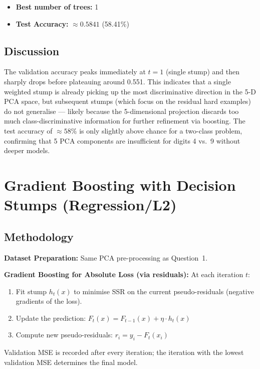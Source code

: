 \documentclass[12pt,a4paper]{article}
\begin{document}
\begin{itemize}[nosep]
  \item \textbf{Best number of trees:} 1
  \item \textbf{Test Accuracy:} $\approx 0.5841$ (58.41\%)
\end{itemize}

\subsection{Discussion}

The validation accuracy peaks immediately at $t=1$ (single stump) and then sharply drops before plateauing around 0.551. This indicates that a single weighted stump is already picking up the most discriminative direction in the 5-D PCA space, but subsequent stumps (which focus on the residual hard examples) do not generalise — likely because the 5-dimensional projection discards too much class-discriminative information for further refinement via boosting. The test accuracy of $\approx58\%$ is only slightly above chance for a two-class problem, confirming that 5 PCA components are insufficient for digits 4 vs.\ 9 without deeper models.

\section{Gradient Boosting with Decision Stumps (Regression/L2)}

\subsection{Methodology}

\textbf{Dataset Preparation:} Same PCA pre-processing as Question~1.

\textbf{Gradient Boosting for Absolute Loss (via residuals):}
At each iteration $t$:
\begin{enumerate}[nosep]
  \item Fit stump $h_t(x)$ to minimise SSR on the current pseudo-residuals (negative gradients of the loss).
  \item Update the prediction: $F_t(x) = F_{t-1}(x) + \eta \cdot h_t(x)$
  \item Compute new pseudo-residuals: $r_i = y_i - F_t(x_i)$
\end{enumerate}
Validation MSE is recorded after every iteration; the iteration with the lowest validation MSE determines the final model.
\end{document}
